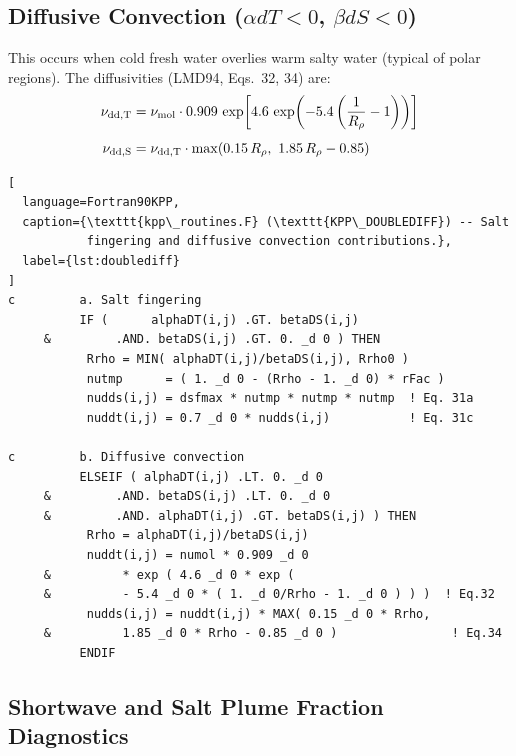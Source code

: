 \documentclass[12pt,letterpaper]{article}
\begin{document}
\subsection{Diffusive Convection ($\alpha dT < 0$, $\beta dS < 0$)}  
  
This occurs when cold fresh water overlies warm salty water (typical of  
polar regions). The diffusivities (LMD94, Eqs.\ 32, 34) are:  
\begin{align}  
\nu_{\rm dd,T} &= \nu_{\rm mol}\cdot 0.909\,\exp\!\left[4.6\,  
  \exp\!\left(-5.4\left(\frac{1}{R_\rho} - 1\right)\right)\right] \\[4pt]  
\nu_{\rm dd,S} &= \nu_{\rm dd,T}\cdot\max\!\left(0.15\,R_\rho,\  
  1.85\,R_\rho - 0.85\right)  
\end{align}  
  
\begin{lstlisting}[  
  language=Fortran90KPP,  
  caption={\texttt{kpp\_routines.F} (\texttt{KPP\_DOUBLEDIFF}) -- Salt  
           fingering and diffusive convection contributions.},  
  label={lst:doublediff}  
]  
c         a. Salt fingering  
          IF (      alphaDT(i,j) .GT. betaDS(i,j)  
     &         .AND. betaDS(i,j) .GT. 0. _d 0 ) THEN  
           Rrho = MIN( alphaDT(i,j)/betaDS(i,j), Rrho0 )  
           nutmp      = ( 1. _d 0 - (Rrho - 1. _d 0) * rFac )  
           nudds(i,j) = dsfmax * nutmp * nutmp * nutmp  ! Eq. 31a  
           nuddt(i,j) = 0.7 _d 0 * nudds(i,j)           ! Eq. 31c  
  
c         b. Diffusive convection  
          ELSEIF ( alphaDT(i,j) .LT. 0. _d 0  
     &         .AND. betaDS(i,j) .LT. 0. _d 0  
     &         .AND. alphaDT(i,j) .GT. betaDS(i,j) ) THEN  
           Rrho = alphaDT(i,j)/betaDS(i,j)  
           nuddt(i,j) = numol * 0.909 _d 0  
     &          * exp ( 4.6 _d 0 * exp (  
     &          - 5.4 _d 0 * ( 1. _d 0/Rrho - 1. _d 0 ) ) )  ! Eq.32  
           nudds(i,j) = nuddt(i,j) * MAX( 0.15 _d 0 * Rrho,  
     &          1.85 _d 0 * Rrho - 0.85 _d 0 )                ! Eq.34  
          ENDIF  
\end{lstlisting}  
  
\subsection{Shortwave and Salt Plume Fraction Diagnostics}  
\label{subsec:shortwave_salt_plume}  
  
\end{document}
